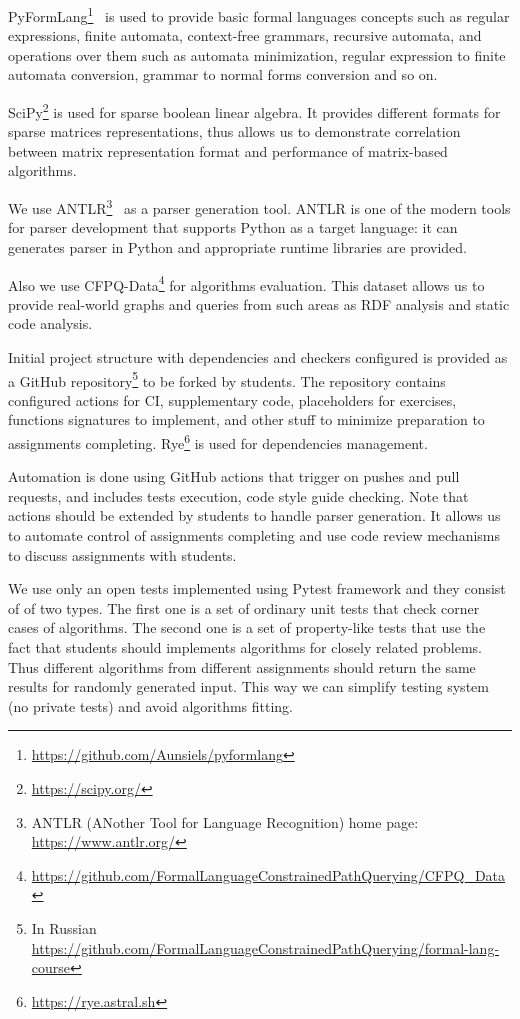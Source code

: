 \documentclass[sigconf]{acmart}
\begin{document}
PyFormLang\footnote{\url{https://github.com/Aunsiels/pyformlang}}~\cite{10.1145/3408877.3432464} is used to provide basic formal languages concepts such as regular expressions, finite automata, context-free grammars, recursive automata, and operations over them such as automata minimization, regular expression to finite automata conversion, grammar to normal forms conversion and so on. 

SciPy\footnote{\url{https://scipy.org/}} is used for sparse boolean linear algebra.
It provides different formats for sparse matrices representations, thus allows us to demonstrate correlation between matrix representation format and performance of matrix-based algorithms. 

We use ANTLR\footnote{ANTLR (ANother Tool for Language Recognition) home page: \url{https://www.antlr.org/}}~\cite{10.5555/2501720} as a parser generation tool.
ANTLR is one of the modern tools for parser development that supports Python as a target language: it can generates parser in Python and appropriate runtime libraries are provided.

Also we use CFPQ-Data\footnote{\url{https://github.com/FormalLanguageConstrainedPathQuerying/CFPQ_Data}} for algorithms evaluation.
This dataset allows us to provide real-world graphs and queries from such areas as RDF analysis and static code analysis. 

Initial project structure with dependencies and checkers configured is provided as a GitHub repository\footnote{In Russian \url{https://github.com/FormalLanguageConstrainedPathQuerying/formal-lang-course}} to be forked by students.
The repository contains configured actions for CI, supplementary code, placeholders for exercises, functions signatures to implement, and other stuff to minimize preparation to assignments completing.
Rye\footnote{\url{https://rye.astral.sh}} is used for dependencies management.

Automation is done using GitHub actions that trigger on pushes and pull requests, and includes tests execution, code style guide checking.
Note that actions should be extended by students to handle parser generation.
It allows us to automate control of assignments completing and use code review mechanisms to discuss assignments with students.

We use only an open tests implemented using Pytest framework and they consist of of two types.
The first one is a set of ordinary unit tests that check corner cases of algorithms.
The second one is a set of property-like tests that use the fact that students should implements algorithms for closely related problems.
Thus different algorithms from different assignments should return the same results for randomly generated input. 
This way we can simplify testing system (no private tests) and avoid algorithms fitting. 
\end{document}
